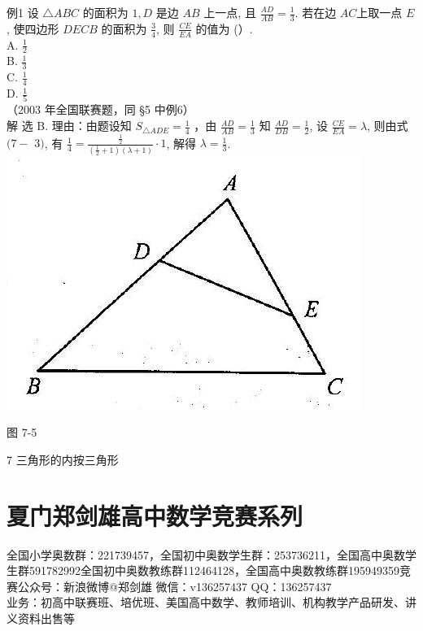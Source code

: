 \documentclass[10pt]{article}
\begin{document}
例1 设 $\triangle A B C$ 的面积为 $1, D$ 是边 $A B$ 上一点, 且 $\frac{A D}{A B}=\frac{1}{3}$. 若在边 $A C$上取一点 $E$, 使四边形 $D E C B$ 的面积为 $\frac{3}{4}$, 则 $\frac{C E}{E A}$ 的值为 (）.\\
A. $\frac{1}{2}$\\
B. $\frac{1}{3}$\\
C. $\frac{1}{4}$\\
D. $\frac{1}{5}$\\
（2003 年全国联赛题，同 §5 中例6）\\
解 选 B. 理由：由题设知 $S_{\triangle A D E}=\frac{1}{4}$ ，由 $\frac{A D}{A B}=\frac{1}{3}$ 知 $\frac{A D}{D B}=\frac{1}{2}$, 设 $\frac{C E}{E A}=\lambda$, 则由式 $(7-$ $3)$, 有 $\frac{1}{4}=\frac{\frac{1}{2}}{\left(\frac{1}{2}+1\right)(\lambda+1)} \cdot 1$, 解得 $\lambda=\frac{1}{3}$.\\
\includegraphics[max width=\textwidth, center]{2024_10_30_2c8f45efd4a519b08e1ag-077}

图 7-5

7 三角形的内按三角形

\section*{夏门郑剑雄高中数学竞赛系列}
全国小学奥数群：221739457，全国初中奥数学生群：253736211，全国高中奥数学生群591782992全国初中奥数教练群112464128，全国高中奥数教练群195949359竞赛公众号：新浪微博@郑剑雄 微信：v136257437 QQ：136257437\\
业务：初高中联赛班、培优班、美国高中数学、教师培训、机构教学产品研发、讲义资料出售等
\end{document}
